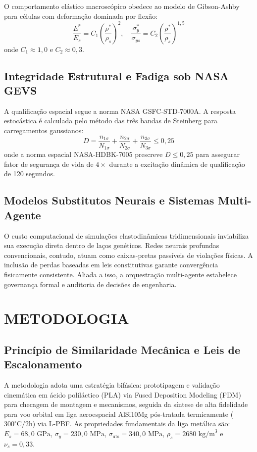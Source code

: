 \documentclass[12pt,a4paper]{report}
\begin{document}
O comportamento elástico macroscópico obedece ao modelo de Gibson-Ashby para células com deformação dominada por flexão:
\begin{equation}
\frac{E^*}{E_s} = C_1 \left(\frac{\rho^*}{\rho_s}\right)^2, \quad \frac{\sigma_y^*}{\sigma_{ys}} = C_2 \left(\frac{\rho^*}{\rho_s}\right)^{1{,}5}
\end{equation}
onde $C_1 \approx 1{,}0$ e $C_2 \approx 0{,}3$.

\section{Integridade Estrutural e Fadiga sob NASA GEVS}
A qualificação espacial segue a norma NASA GSFC-STD-7000A. A resposta estocástica é calculada pelo método das três bandas de Steinberg para carregamentos gaussianos:
\begin{equation}
D = \frac{n_{1\sigma}}{N_{1\sigma}} + \frac{n_{2\sigma}}{N_{2\sigma}} + \frac{n_{3\sigma}}{N_{3\sigma}} \le 0{,}25
\end{equation}
onde a norma espacial NASA-HDBK-7005 prescreve $D \le 0{,}25$ para assegurar fator de segurança de vida de $4\times$ durante a excitação dinâmica de qualificação de 120 segundos.

\section{Modelos Substitutos Neurais e Sistemas Multi-Agente}
O custo computacional de simulações elastodinâmicas tridimensionais inviabiliza sua execução direta dentro de laços genéticos. Redes neurais profundas convencionais, contudo, atuam como caixas-pretas passíveis de violações físicas. A inclusão de perdas baseadas em leis constitutivas garante convergência fisicamente consistente. Aliada a isso, a orquestração multi-agente estabelece governança formal e auditoria de decisões de engenharia.

\chapter{METODOLOGIA}

\section{Princípio de Similaridade Mecânica e Leis de Escalonamento}
A metodologia adota uma estratégia bifásica: prototipagem e validação cinemática em ácido poliláctico (PLA) via Fused Deposition Modeling (FDM) para checagem de montagem e mecanismos, seguida da síntese de alta fidelidade para voo orbital em liga aeroespacial AlSi10Mg pós-tratada termicamente ($300^\circ\text{C} / 2\text{h}$) via L-PBF. As propriedades fundamentais da liga metálica são: $E_s = 68{,}0\text{ GPa}$, $\sigma_y = 230{,}0\text{ MPa}$, $\sigma_{\text{uts}} = 340{,}0\text{ MPa}$, $\rho_s = 2680\text{ kg/m}^3$ e $\nu_s = 0{,}33$.
\end{document}
